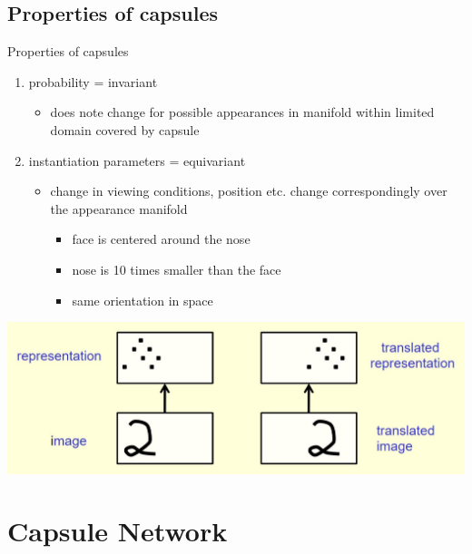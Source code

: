 \documentclass{beamer}
\begin{document}
\subsection{Properties of capsules}
\begin{frame}{Properties of capsules}
    \begin{enumerate}
    \item {
        probability = invariant}
    \begin{itemize}
        \item does note change for possible appearances in manifold within limited domain covered by capsule
    \end{itemize}
    
    \item {
    instantiation parameters = equivariant}
    \begin{itemize}
        \item change in viewing conditions, position etc. change correspondingly over the appearance manifold
        \begin{itemize}
            \item face is centered around the nose
            \item nose is 10 times smaller than the face
            \item same orientation in space
        \end{itemize}
    \end{itemize}
    
    \end{enumerate}
    \centering
    \includegraphics[scale=0.5]{equivariance.JPG}
\end{frame}

\section{Capsule Network}
\end{document}
